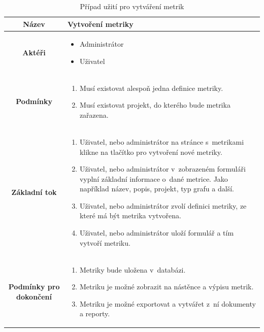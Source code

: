 \documentclass[czech,master]{diploma}
\begin{document}
\begin{table}[htp]
\begin{center}
\begin{tabular}{c | m{10cm}}

\textbf{Název} & Vytvoření metriky \\ 
\hline
\textbf{Aktéři} & 
\begin{itemize}
\item Administrátor
\item Uživatel
\end{itemize}
\\ 
\hline
\textbf{Podmínky} & 
\begin{enumerate}
\item Musí existovat alespoň jedna definice metriky.
\item Musí existovat projekt, do kterého bude metrika zařazena.
\end{enumerate}
 
\\ 
\hline
\textbf{Základní tok} &                                                                              
\begin{enumerate}
\item Uživatel, nebo administrátor na stránce s~metrikami klikne na tlačítko pro vytvoření nové metriky.
\item Uživatel, nebo administrátor v~zobrazeném formuláři vyplní základní informace o~dané metrice. Jako například název, popis, projekt, typ grafu a další.
\item Uživatel, nebo administrátor zvolí definici metriky, ze které má být metrika vytvořena.
\item Uživatel, nebo administrátor uloží formulář a tím vytvoří metriku.
\end{enumerate}
\\ 
\hline

\textbf{Podmínky pro dokončení} & 
\begin{enumerate}
\item Metriky bude uložena v~databázi.
\item Metriku je možné zobrazit na nástěnce a výpisu metrik.
\item Metriku je možné exportovat a vytvářet z~ní dokumenty a reporty.
\end{enumerate}                                                                                          
\end{tabular}
\caption{Případ užití pro vytváření metrik}
\label{tab:use_case_create_metric}
\end{center}
\end{table}
\end{document}
